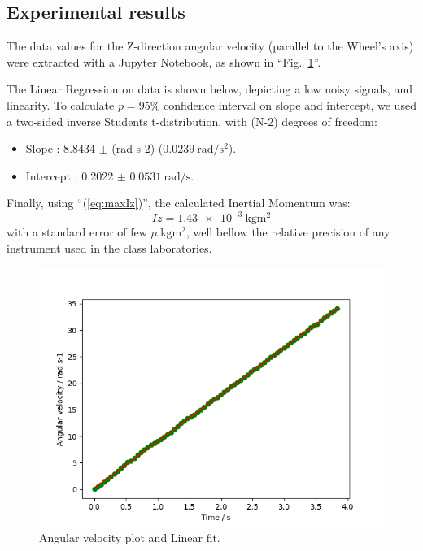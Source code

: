 \documentclass[conference]{IEEEtran}
\begin{document}
\subsection{Experimental results}
The data values for the Z-direction angular velocity (parallel to the Wheel's axis) were extracted with a Jupyter Notebook, as shown in ``Fig.~\ref{figAngleVel}''. 

The Linear Regression on data is shown below, depicting a low noisy signals, and linearity.  
To calculate $p=95\%$ confidence interval on slope and intercept, we used a two-sided inverse Students t-distribution, with (N-2) degrees of freedom:

\begin{itemize}
    \item Slope : 8.8434 $\pm$ (rad s-2) ($\SI{0.0239}{\radian\per\second\squared}$).

    \item Intercept : 0.2022 $\pm$ $\SI{0.0531}{\radian\per\second}$.
\end{itemize}

Finally, using ``(\eqref{eq:maxIz})'', the calculated Inertial Momentum was:
\begin{equation}
     Iz  = \SI{1.43e-3}{\kg\meter\squared}
\end{equation}
with a standard error of few $\mu\SI{}{\kg\meter\squared}$, well bellow the relative precision of any instrument used in the class laboratories.

  
\begin{figure}[tbp]
\centerline{\includegraphics[width=.9\columnwidth]{AngAccel.png}}
\caption{Angular velocity plot and Linear fit.}
\label{figAngleVel}
\end{figure}
\end{document}
